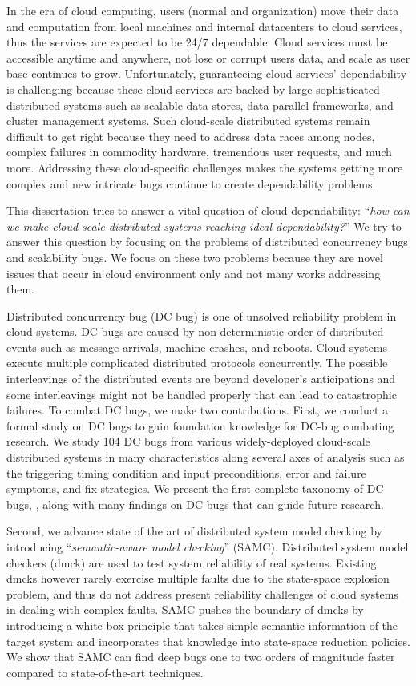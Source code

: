 In the era of cloud computing, users (normal and organization) move their data
and computation from local machines and internal datacenters to cloud services,
thus the services are expected to be 24/7 dependable. Cloud services must be
accessible anytime and anywhere, not lose or corrupt users data, and scale as
user base continues to grow.  Unfortunately, guaranteeing cloud services'
dependability is challenging because these cloud services are backed by large
sophisticated distributed systems such as scalable data stores, data-parallel
frameworks, and cluster management systems. Such cloud-scale distributed systems
remain difficult to get right because they need to address data races among
nodes, complex failures in commodity hardware, tremendous user requests, and
much more. Addressing these cloud-specific challenges makes the systems getting
more complex and new intricate bugs continue to create dependability problems.

This dissertation tries to answer a vital question of cloud dependability:
``{\em how can we make cloud-scale distributed systems reaching ideal
dependability?}'' We try to answer this question by focusing on the problems of
distributed concurrency bugs and scalability bugs. We focus on these two
problems because they are novel issues that occur in cloud environment only and
not many works addressing them.

Distributed concurrency bug (DC bug) is one of unsolved reliability problem in
cloud systems. DC bugs are caused by non-deterministic order of distributed
events such as message arrivals, machine crashes, and reboots. Cloud systems
execute multiple complicated distributed protocols concurrently. The possible
interleavings of the distributed events are beyond developer's anticipations and
some interleavings might not be handled properly that can lead to catastrophic
failures.
%
To combat DC bugs, we make two contributions. First, we conduct a formal study
on DC bugs to gain foundation knowledge for DC-bug combating research. We study
104 DC bugs from various widely-deployed cloud-scale distributed systems in
many characteristics along several axes of analysis such as the triggering
timing condition and input preconditions, error and failure symptoms, and fix
strategies. We present the first complete taxonomy of DC bugs, \taxdc, along
with many findings on DC bugs that can guide future research.

Second, we advance state of the art of distributed system model checking by
introducing ``{\em semantic-aware model checking}'' (SAMC). Distributed system
model checkers (dmck) are used to test system reliability of real systems.
Existing dmcks however rarely exercise multiple faults due to the state-space
explosion problem, and thus do not address present reliability challenges of
cloud systems in dealing with complex faults. SAMC pushes the boundary of dmcks
by introducing a white-box principle that takes simple semantic information of
the target system and incorporates that knowledge into state-space reduction
policies.  We show that SAMC can find deep bugs one to two orders of magnitude
faster compared to state-of-the-art techniques. 

